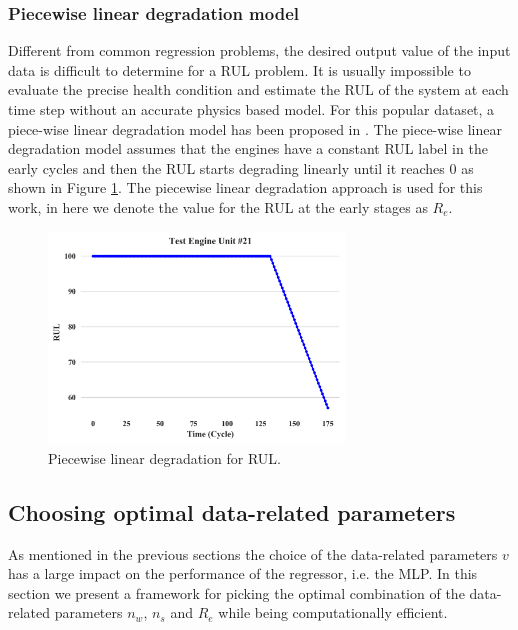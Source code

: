 \documentclass[12pt]{IEEEtran}%
\begin{document}
\subsubsection{Piecewise linear degradation model}

Different from common regression problems, the desired output value of the input data is difficult to determine for a RUL problem. It is usually impossible to evaluate the precise health condition and estimate the RUL of the system at each time step without an accurate physics based model. For this popular dataset, a piece-wise linear degradation model has been proposed in \cite{Ramasso2014}. The piece-wise linear degradation model assumes that the engines have a constant RUL label in the early cycles and then the RUL starts degrading linearly until it reaches 0 as shown in Figure \ref{fig:piecewise_model}. The piecewise linear degradation approach is used for this work, in here we denote the value for the RUL at the early stages as $R_e$. 

\begin{figure}[!htb]
\centering
\includegraphics[width=0.7\textwidth]{../img/test_engine.png}
\caption{Piecewise linear degradation for RUL.}
\label{fig:piecewise_model}
\end{figure}

\subsection{Choosing optimal data-related parameters}
\label{sec:choosing_otimal_data-related_params}

As mentioned in the previous sections the choice of the data-related parameters $v$ has a large impact on the performance of the regressor, i.e. the MLP. In this section we present a framework for picking the optimal combination of the data-related parameters $n_w$, $n_s$ and $R_e$ while being computationally efficient.
\end{document}
